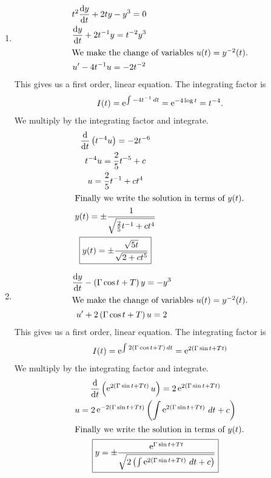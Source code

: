 {%
\begin{Solution}
  \label{solution t2dydt+2ty-y3=0}
  \begin{enumerate}
  \item
    \begin{gather*}
      t^2 \frac{\mathrm{d} y}{\mathrm{d} t} + 2 t y - y^3 = 0 \\
      \frac{\mathrm{d} y}{\mathrm{d} t} + 2 t^{-1} y = t^{-2} y^3 \\
      \intertext{We make the change of variables $u(t) = y^{-2}(t)$.}
      u' - 4 t^{-1} u = -2 t^{-2} 
    \end{gather*}
    This gives us a first order, linear equation.  The integrating factor is
    \[
    I(t) = \mathop{\mathrm{e}}\nolimits^{\int -4 t^{-1} \,d t} = \mathop{\mathrm{e}}\nolimits^{-4 \log t} = t^{-4}.
    \]
    We multiply by the integrating factor and integrate.
    \begin{gather*}
      \frac{\mathrm{d}}{\mathrm{d} t} \left( t^{-4} u \right) = -2 t^{-6} \\
      t^{-4} u = \frac{2}{5} t^{-5} + c \\
      u = \frac{2}{5} t^{-1} + c t^4 \\
      \intertext{Finally we write the solution in terms of $y(t)$.}
      y(t) = \pm \frac{1}{ \sqrt{ \frac{2}{5} t^{-1} + c t^4 } } \\
      \boxed{
        y(t) = \pm \frac{ \sqrt{5 t} }{ \sqrt{ 2 + c t^5 } }
        }
    \end{gather*}
  \item
    \begin{gather*}
      \frac{\mathrm{d} y}{\mathrm{d} t} - \left( \Gamma \cos t + T \right) y = - y^3 \\
      \intertext{We make the change of variables $u(t) = y^{-2}(t)$.}
      u' + 2 \left( \Gamma \cos t + T \right) u = 2 
    \end{gather*}
    This gives us a first order, linear equation.  The integrating factor is
    \[
    I(t) = \mathop{\mathrm{e}}\nolimits^{\int 2 (\Gamma \cos t + T) \,d t} = \mathop{\mathrm{e}}\nolimits^{ 2 (\Gamma \sin t + T t)}
    \]
    We multiply by the integrating factor and integrate.
    \begin{gather*}
      \frac{\mathrm{d}}{\mathrm{d} t} \left( \mathop{\mathrm{e}}\nolimits^{2 (\Gamma \sin t + T t) } u \right) 
      = 2 \mathop{\mathrm{e}}\nolimits^{2 (\Gamma \sin t + T t) } \\
      u = 2 \mathop{\mathrm{e}}\nolimits^{- 2 (\Gamma \sin t + T t) } \left( 
        \int \mathop{\mathrm{e}}\nolimits^{2 (\Gamma \sin t + T t) } \,d t + c \right) \\
      \intertext{Finally we write the solution in terms of $y(t)$.}
      \boxed{
        y = \pm \frac{ \mathop{\mathrm{e}}\nolimits^{ \Gamma \sin t + T t } }
        {\sqrt{ 2 \left( \int \mathop{\mathrm{e}}\nolimits^{2 (\Gamma \sin t + T t) } \,d t + c \right)}}
        }
    \end{gather*}
  \end{enumerate}
\end{Solution}








}
